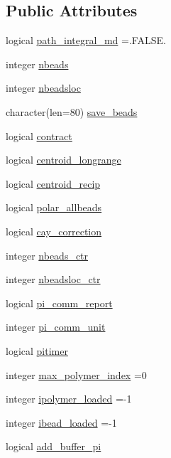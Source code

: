 \subsection*{Public Attributes}
\begin{DoxyCompactItemize}
\item 
logical \hyperlink{classbeads_a73d340bf9e10cc72a21f4efe65667093}{path\-\_\-integral\-\_\-md} =.F\-A\-L\-S\-E.
\item 
integer \hyperlink{classbeads_af2080ec4bc7bbcf0c79ecec326e1d09c}{nbeads}
\item 
integer \hyperlink{classbeads_a249177398ee35c3836f0abb82eab8edd}{nbeadsloc}
\item 
character(len=80) \hyperlink{classbeads_a7f5dc8a98fd4571afd6cff2250578f83}{save\-\_\-beads}
\item 
logical \hyperlink{classbeads_afcca94caf03fb392889db93cd120504f}{contract}
\item 
logical \hyperlink{classbeads_a93834d2ff15b4fb83ec6772666a2f521}{centroid\-\_\-longrange}
\item 
logical \hyperlink{classbeads_a51794c51cf3c21074decc3ba51ee435c}{centroid\-\_\-recip}
\item 
logical \hyperlink{classbeads_adad817f105ba6e27f7f279166873ebf6}{polar\-\_\-allbeads}
\item 
logical \hyperlink{classbeads_a08ceabf65355ea75dacc54a1cc1613bb}{cay\-\_\-correction}
\item 
integer \hyperlink{classbeads_a44efdcee98e53b88242fb574bf7a3fe1}{nbeads\-\_\-ctr}
\item 
integer \hyperlink{classbeads_ac980eb32841995e3c9bbd1aec69704fe}{nbeadsloc\-\_\-ctr}
\item 
logical \hyperlink{classbeads_a0d974936f1ea3d107942bc5c6a0ccffb}{pi\-\_\-comm\-\_\-report}
\item 
integer \hyperlink{classbeads_a1101fc1a583313a5a1d66a43d80e6c3f}{pi\-\_\-comm\-\_\-unit}
\item 
logical \hyperlink{classbeads_a7347e75d7715131be1ef685b82104fe5}{pitimer}
\item 
integer \hyperlink{classbeads_a5f339ae3ed13a47d482c85a859c6abef}{max\-\_\-polymer\-\_\-index} =0
\item 
integer \hyperlink{classbeads_ac483e5724b9ae3832d38222a33f15557}{ipolymer\-\_\-loaded} =-\/1
\item 
integer \hyperlink{classbeads_abb845f8ec585fbfc83b865944e087f39}{ibead\-\_\-loaded} =-\/1
\item 
logical \hyperlink{classbeads_a40dd4afa94e57ef66b7ba70a56704450}{add\-\_\-buffer\-\_\-pi}

\end{DoxyCompactItemize}
